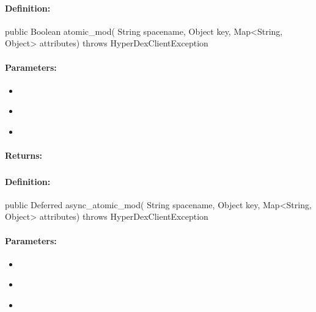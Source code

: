 \paragraph{Definition:}
\begin{javacode}
public Boolean atomic_mod(
        String spacename,
        Object key,
        Map<String, Object> attributes) throws HyperDexClientException
\end{javacode}

\paragraph{Parameters:}
\begin{itemize}[noitemsep]
\item {}\\

\item {}\\

\item {}\\

\end{itemize}

\paragraph{Returns:}


\pagebreak
\subsubsection{}
\label{api:java:async_atomic_mod}


\paragraph{Definition:}
\begin{javacode}
public Deferred async_atomic_mod(
        String spacename,
        Object key,
        Map<String, Object> attributes) throws HyperDexClientException
\end{javacode}

\paragraph{Parameters:}
\begin{itemize}[noitemsep]
\item {}\\

\item {}\\

\item {}\\

\end{itemize}

